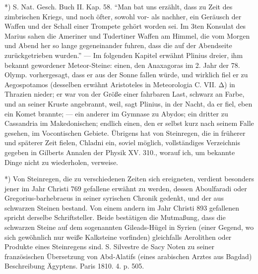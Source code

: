 \documentclass[a4paper, 11pt, oneside, polutonikogreek, german]{article}
\begin{document}
*) S. Nat. Gesch. Buch II. Kap. 58. "`Man bat uns erzählt, dass zu Zeit des zimbrischen Kriegs, und noch öfter, sowohl vor- als nachher, ein Geräusch der Waffen und der Schall einer Trompete gehört worden sei. Im 3ten Konsulat des Marius sahen die Ameriner und Tudertiner Waffen am Himmel, die vom Morgen und Abend her so lange gegeneinander fuhren, dass die auf der Abendseite zurückgetrieben wurden."' --- Im folgenden Kapitel erwähnt Plinius dreier, ihm bekannt gewordener Meteor-Steine: einen, den Anaxagoras im 2. Jahr der 78. Olymp. vorhergesagt, dass er aus der Sonne fallen würde, und wirklich fiel er zu Aegospotamos (desselben erwähnt Aristoteles in Meteorologia C. VII. Δ) in Thrazien nieder; er war von der Größe einer fahrbaren Last, schwarz an Farbe, und an seiner Kruste angebrannt, weil, sagt Plinius, in der Nacht, da er fiel, eben ein Komet brannte; --- ein anderer im Gymnase zu Abydos; ein dritter zu Cassandria im Makedonischen; endlich einen, den er selbst kurz nach seinem Falle gesehen, im Vocontischen Gebiete. Übrigens hat von Steinregen, die in früherer und späterer Zeit fielen, Chladni ein, soviel möglich, vollständiges Verzeichnis gegeben in Gilberts Annalen der Physik XV. 310., worauf ich, um bekannte Dinge nicht zu wiederholen, verweise.

*) Von Steinregen, die zu verschiedenen Zeiten sich ereigneten, verdient besonders jener im Jahr Christi 769 gefallene erwähnt zu werden, dessen Aboulfaradi oder Gregorius-barhebraeus in seiner syrischen Chronik gedenkt, und der aus schwarzen Steinen bestand. Von einem andern im Jahr Christi 893 gefallenen spricht derselbe Schriftsteller. Beide bestätigen die Mutmaßung, dass die schwarzen Steine auf dem sogenannten Gileads-Hügel in Syrien (einer Gegend, wo sich gewöhnlich nur weiße Kalksteine vorfinden) gleichfalls Aerolithen oder Produkte eines Steinregens sind. S. Silvestre de Sacy Noten zu seiner französischen Übersetzung von Abd-Alatifs (eines arabischen Arztes aus Bagdad) Beschreibung Ägyptens. Paris 1810. 4. p. 505.
\end{document}
